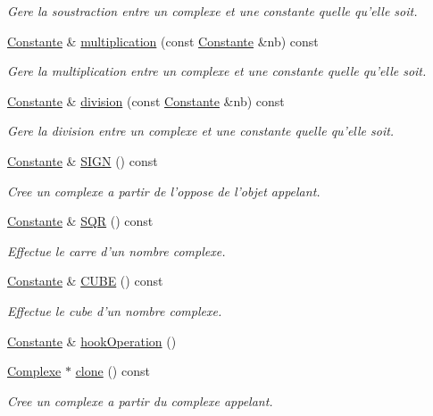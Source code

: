 \begin{DoxyCompactItemize}
\begin{DoxyCompactList}\small\item\em \-Gere la soustraction entre un complexe et une constante quelle qu'elle soit. \end{DoxyCompactList}\item 
\hyperlink{class_l_o21_1_1_constante}{\-Constante} \& \hyperlink{class_l_o21_1_1_complexe_aa52efe24813e29d3ae868404c1650cd3}{multiplication} (const \hyperlink{class_l_o21_1_1_constante}{\-Constante} \&nb) const 
\begin{DoxyCompactList}\small\item\em \-Gere la multiplication entre un complexe et une constante quelle qu'elle soit. \end{DoxyCompactList}\item 
\hyperlink{class_l_o21_1_1_constante}{\-Constante} \& \hyperlink{class_l_o21_1_1_complexe_abcf2883f67e57e3ad2b376ea39727fd3}{division} (const \hyperlink{class_l_o21_1_1_constante}{\-Constante} \&nb) const 
\begin{DoxyCompactList}\small\item\em \-Gere la division entre un complexe et une constante quelle qu'elle soit. \end{DoxyCompactList}\item 
\hyperlink{class_l_o21_1_1_constante}{\-Constante} \& \hyperlink{class_l_o21_1_1_complexe_aee563da58f38b8c0295133023f00e09e}{\-S\-I\-G\-N} () const 
\begin{DoxyCompactList}\small\item\em \-Cree un complexe a partir de l'oppose de l'objet appelant. \end{DoxyCompactList}\item 
\hyperlink{class_l_o21_1_1_constante}{\-Constante} \& \hyperlink{class_l_o21_1_1_complexe_a2289c8e181d428d842ed2228f146d1ab}{\-S\-Q\-R} () const 
\begin{DoxyCompactList}\small\item\em \-Effectue le carre d'un nombre complexe. \end{DoxyCompactList}\item 
\hyperlink{class_l_o21_1_1_constante}{\-Constante} \& \hyperlink{class_l_o21_1_1_complexe_af3cba1596766da1820b1e1a52768f145}{\-C\-U\-B\-E} () const 
\begin{DoxyCompactList}\small\item\em \-Effectue le cube d'un nombre complexe. \end{DoxyCompactList}\item 
\hyperlink{class_l_o21_1_1_constante}{\-Constante} \& \hyperlink{class_l_o21_1_1_complexe_a5d383443b7a02ccf583daaadcbff2449}{hook\-Operation} ()
\item 
\hyperlink{class_l_o21_1_1_complexe}{\-Complexe} $\ast$ \hyperlink{class_l_o21_1_1_complexe_a7a7a8d883e959fd7d5f84d5b2b7b2a9e}{clone} () const 
\begin{DoxyCompactList}\small\item\em \-Cree un complexe a partir du complexe appelant. \end{DoxyCompactList}\end{DoxyCompactItemize}


